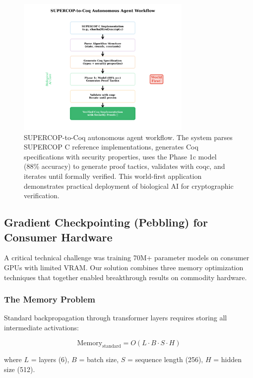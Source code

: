 \documentclass[12pt]{article}
\begin{document}
\begin{figure}[h]
\centering
\includegraphics[width=0.75\textwidth]{figure6_supercop_workflow.png}
\caption{SUPERCOP-to-Coq autonomous agent workflow. The system parses SUPERCOP C reference implementations, generates Coq specifications with security properties, uses the Phase 1c model (88\% accuracy) to generate proof tactics, validates with coqc, and iterates until formally verified. This world-first application demonstrates practical deployment of biological AI for cryptographic verification.}
\label{fig:supercop}
\end{figure}

\subsection{Gradient Checkpointing (Pebbling) for Consumer Hardware}
\label{sec:pebbling}

A critical technical challenge was training 70M+ parameter models on consumer GPUs with limited VRAM. Our solution combines three memory optimization techniques that together enabled breakthrough results on commodity hardware.

\subsubsection{The Memory Problem}

Standard backpropagation through transformer layers requires storing all intermediate activations:

\begin{equation}
\text{Memory}_{\text{standard}} = O(L \cdot B \cdot S \cdot H)
\end{equation}

where $L$ = layers (6), $B$ = batch size, $S$ = sequence length (256), $H$ = hidden size (512).
\end{document}
